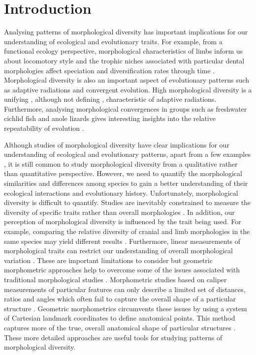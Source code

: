 \chapter{Introduction}
\label{chap:introduction}

\noindent
	Analysing patterns of morphological diversity has important implications for our understanding of ecological and evolutionary traits. For example, from a functional ecology perspective, morphological characteristics of limbs inform us about locomotory style \citep[e.g.][]{Bou1987} and the trophic niches associated with particular dental morphologies affect speciation and diversification rates through time \citep{Price2012}. Morphological diversity is also an important aspect of evolutionary patterns such as adaptive radiations and convergent evolution. High morphological diversity is a unifying \citep{Losos2010a, Olson2009}, although not defining \citep{Glor2010, Olson2009}, characteristic of adaptive radiations. Furthermore, analysing morphological convergences in groups such as freshwater cichlid fish \citep{Muschick2012} and anole lizards \citep{Mahler2013} gives interesting insights into the relative repeatability of evolution \citep{Losos2011}.

	Although studies of morphological diversity have clear implications for our understanding of ecological and evolutionary patterns, apart from a few examples \citep[e.g.][]{Ruta2013, Goswami2011, Brusatte2008}, it is still common to study morphological diversity from a qualitative rather than quantitative perspective. However, we need to quantify the morphological similarities and differences among species to gain a better understanding of their ecological interactions and evolutionary history. Unfortunately, morphological diversity is difficult to quantify. Studies are inevitably constrained to measure the diversity of specific traits rather than overall morphologies \citep{Roy1997}. In addition, our perception of morphological diversity is influenced by the trait being used. For example, comparing the relative diversity of cranial and limb morphologies in the same species may yield different results \citep{Foth2012}. Furthermore, linear measurements of morphological traits can restrict our understanding of overall morphological variation \citep{Rohlf1993}. These are important limitations to consider but geometric morphometric approaches help to overcome some of the issues associated with traditional morphological studies \citep{Adams2004}. Morphometric studies based on caliper measurements of particular features can only describe a limited set of distances, ratios and angles which often fail to capture the overall shape of a particular structure \citep{Slice2007}. Geometric morphometrics circumvents these issues by using a system of Cartesian landmark coordinates to define anatomical points. This method captures more of the true, overall anatomical shape of particular structures \citep{Mitteroecker2009}. These more detailed approaches are useful tools for studying patterns of morphological diversity.
	

